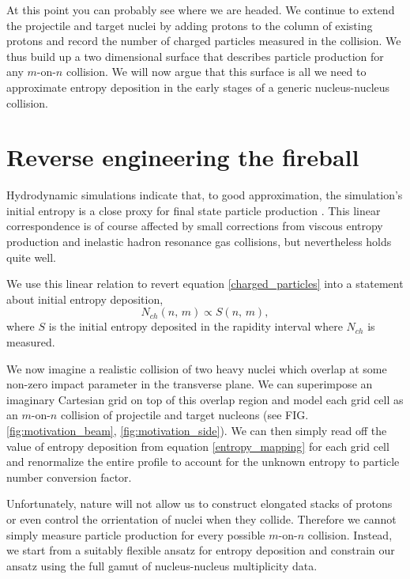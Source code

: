 \documentclass[aps,prc,reprint,amsmath,nofootinbib]{revtex4-1}
\begin{document}
At this point you can probably see where we are headed. We continue to extend the projectile and target nuclei by adding  protons to the column of existing protons 
and record the number of charged particles measured in the collision. We thus build up a two dimensional surface that describes particle production for any $m$-on-$n$ 
collision. We will now argue that this surface is all we need to approximate entropy deposition in the early stages of a generic nucleus-nucleus collision. 

\section{Reverse engineering the fireball}
\label{sec:reverse_engineering}

Hydrodynamic simulations indicate that, to good approximation, the simulation's initial entropy is a close proxy for final state particle production \cite{Song:2008si}. 
This linear correspondence is of course affected by small corrections from viscous entropy production and inelastic hadron resonance gas collisions, but nevertheless 
holds quite well. 

We use this linear relation to revert equation \ref{charged_particles} into a statement about initial entropy deposition,
\begin{equation}
 \label{entropy_mapping}
 N_{ch}(n,\, m) \propto S(n,\, m),
\end{equation}
where $S$ is the initial entropy deposited in the rapidity interval where $N_{ch}$ is measured.

We now imagine a realistic collision of two heavy nuclei which overlap at some non-zero impact parameter in the transverse plane. We can superimpose an imaginary
Cartesian grid on top of this overlap region and model each grid cell as an $m$-on-$n$ collision of projectile and target nucleons 
(see FIG. \ref{fig:motivation_beam}, \ref{fig:motivation_side}). We can then simply read off the value of entropy deposition from equation \ref{entropy_mapping} 
for each grid cell and renormalize the entire profile to account for the unknown entropy to particle number conversion factor.

Unfortunately, nature will not allow us to construct elongated stacks of protons or even control the orrientation of nuclei when they collide. Therefore we cannot simply
measure particle production for every possible $m$-on-$n$ collision. Instead, we start from a suitably flexible ansatz for entropy deposition and constrain our ansatz 
using the full gamut of nucleus-nucleus multiplicity data.
\end{document}
